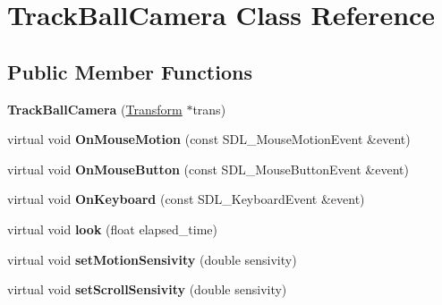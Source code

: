 \hypertarget{class_track_ball_camera}{
\section{TrackBallCamera Class Reference}
\label{class_track_ball_camera}
}
\subsection*{Public Member Functions}
\begin{DoxyCompactItemize}
\item 
\hypertarget{class_track_ball_camera_adbd6e929a53521c1511379cee2efe5b2}{
{\bfseries TrackBallCamera} (\hyperlink{class_transform}{Transform} $\ast$trans)}
\label{class_track_ball_camera_adbd6e929a53521c1511379cee2efe5b2}

\item 
\hypertarget{class_track_ball_camera_a7a700f13749637899fb8749e8d136598}{
virtual void {\bfseries OnMouseMotion} (const SDL\_\-MouseMotionEvent \&event)}
\label{class_track_ball_camera_a7a700f13749637899fb8749e8d136598}

\item 
\hypertarget{class_track_ball_camera_a68e4695d4439a0f1a9dffdc474f9bcf2}{
virtual void {\bfseries OnMouseButton} (const SDL\_\-MouseButtonEvent \&event)}
\label{class_track_ball_camera_a68e4695d4439a0f1a9dffdc474f9bcf2}

\item 
\hypertarget{class_track_ball_camera_ac9d63bf5e2cc37176266d0f9002b6182}{
virtual void {\bfseries OnKeyboard} (const SDL\_\-KeyboardEvent \&event)}
\label{class_track_ball_camera_ac9d63bf5e2cc37176266d0f9002b6182}

\item 
\hypertarget{class_track_ball_camera_a592b46a7423b31dcdad6f6a7e6aff1a7}{
virtual void {\bfseries look} (float elapsed\_\-time)}
\label{class_track_ball_camera_a592b46a7423b31dcdad6f6a7e6aff1a7}

\item 
\hypertarget{class_track_ball_camera_a9942af262cd33039575f5c703304cc44}{
virtual void {\bfseries setMotionSensivity} (double sensivity)}
\label{class_track_ball_camera_a9942af262cd33039575f5c703304cc44}

\item 
\hypertarget{class_track_ball_camera_a55305b75b15ea49df24b89d591798661}{
virtual void {\bfseries setScrollSensivity} (double sensivity)}
\label{class_track_ball_camera_a55305b75b15ea49df24b89d591798661}

\end{DoxyCompactItemize}
